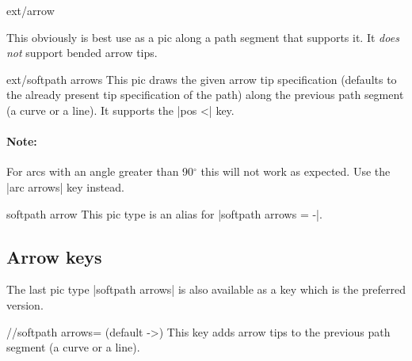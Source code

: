 \begin{multicols}{2}
\begin{pictype}{ext/arrow}{}
  
  This obviously is best use as a pic along a path segment that supports it.
  It \emph{does not} support bended arrow tips.
\begin{codeexample}[preamble=\usetikzlibrary{bending, ext.arrows-plus}]
\end{codeexample}
\end{pictype}

\begin{pictype}{ext/softpath arrows}{}
  This pic draws the given arrow tip specification
  (defaults to the already present tip specification of the path)
  along the previous path segment (a curve or a line).
  It supports the |pos <| key.
  
  \paragraph{Note:} For arcs with an angle greater than 90${}^\circ$
    this will not work as expected. Use the |arc arrows| key instead.
\end{pictype}
\begin{pictype}{softpath arrow}{}
  This pic type is an alias for |softpath arrows = -|.
\end{pictype}

\subsection{Arrow keys}
The last pic type |softpath arrows| is also available as a key
which is the preferred version.
\begin{key}{/\tikzext/softpath arrows= (default ->)}
This key adds arrow tips to the previous path segment (a curve or a line).


\end{key}
\end{multicols}

